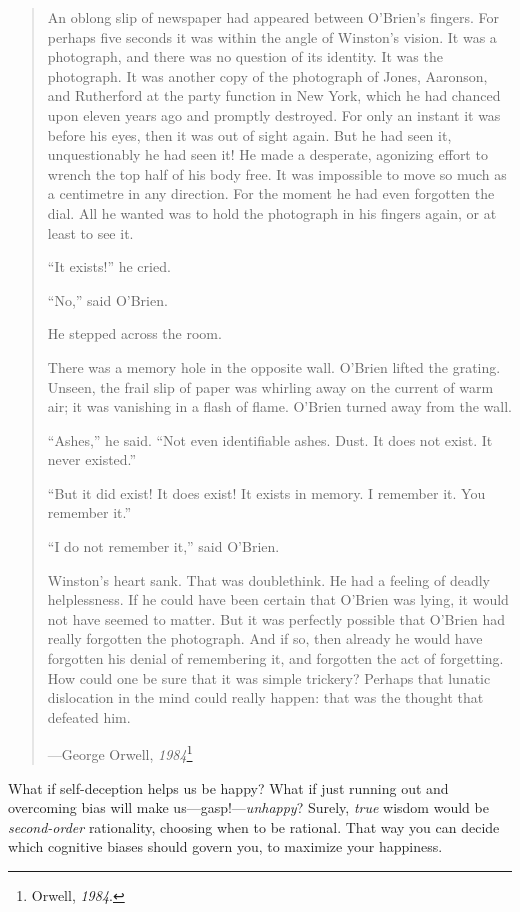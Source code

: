 \begin{quotation}
{
 An oblong slip of newspaper had appeared between
O'Brien's fingers. For perhaps five
seconds it was within the angle of Winston's vision. It
was a photograph, and there was no question of its identity. It was the
photograph. It was another copy of the photograph of Jones, Aaronson,
and Rutherford at the party function in New York, which he had chanced
upon eleven years ago and promptly destroyed. For only an instant it
was before his eyes, then it was out of sight again. But he had seen
it, unquestionably he had seen it! He made a desperate, agonizing
effort to wrench the top half of his body free. It was impossible to
move so much as a centimetre in any direction. For the moment he had
even forgotten the dial. All he wanted was to hold the photograph in
his fingers again, or at least to see it.}

{
 ``It exists!'' he cried.}

{
 ``No,'' said
O'Brien.}

{
 He stepped across the room.}

{
 There was a memory hole in the opposite wall.
O'Brien lifted the grating. Unseen, the frail slip of
paper was whirling away on the current of warm air; it was vanishing in
a flash of flame. O'Brien turned away from the wall.}

{
 ``Ashes,'' he said.
``Not even identifiable ashes. Dust. It does not
exist. It never existed.''}

{
 ``But it did exist! It does exist! It exists in
memory. I remember it. You remember it.''}

{
 ``I do not remember it,'' said
O'Brien.}

{
 Winston's heart sank. That was doublethink. He had
a feeling of deadly helplessness. If he could have been certain that
O'Brien was lying, it would not have seemed to matter.
But it was perfectly possible that O'Brien had really
forgotten the photograph. And if so, then already he would have
forgotten his denial of remembering it, and forgotten the act of
forgetting. How could one be sure that it was simple trickery? Perhaps
that lunatic dislocation in the mind could really happen: that was the
thought that defeated him.}

{\raggedleft
 {}---George Orwell, \textit{1984}\footnote{Orwell, \textit{1984}.}
\par}
\end{quotation}


{
 What if self-deception helps us be happy? What if just running out
and overcoming bias will make us---gasp!---\textit{unhappy}? Surely,
\textit{true} wisdom would be \textit{second-order} rationality,
choosing when to be rational. That way you can decide which cognitive
biases should govern you, to maximize your happiness.}

